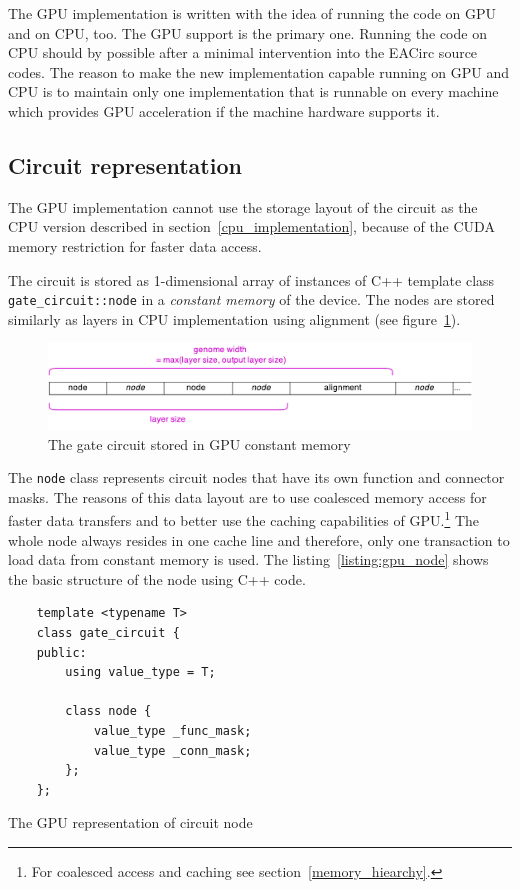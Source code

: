 \documentclass[12pt,twoside]{fithesis2}
\begin{document}
The GPU implementation is written with the idea of running the code on GPU and on CPU, too. The GPU support is the primary one. Running the code on CPU should by possible after a minimal intervention into the EACirc source codes. The reason to make the new implementation capable running on GPU and CPU is to maintain only one implementation that is runnable on every machine which provides GPU acceleration if the machine hardware supports it.

\subsection{Circuit representation}
\label{gpu_curcuit_repr}

The GPU implementation cannot use the storage layout of the circuit as the CPU version described in section~\ref{cpu_implementation}, because of the CUDA memory restriction for faster data access.

The circuit is stored as 1-dimensional array of instances of C++ template class \texttt{gate\_circuit::node} in a \emph{constant memory} of the device. The nodes are stored similarly as layers in CPU implementation using alignment (see figure~\ref{fig:gpu_genome}).

\begin{figure}[h]
	\centering
	\includegraphics[width=\textwidth]{figures/gpu_genome.pdf}
	\caption{The gate circuit stored in GPU constant memory}
	\label{fig:gpu_genome}
\end{figure}


The \texttt{node} class represents circuit nodes that have its own function and connector masks. The reasons of this data layout are to use coalesced memory access for faster data transfers and to better use the caching capabilities of GPU.\footnote{For coalesced access and caching see section~\ref{memory_hiearchy}.} The whole node always resides in one cache line and therefore, only one transaction to load data from constant memory is used. The listing~\ref{listing:gpu_node} shows the basic structure of the node using C++ code.

\begin{listing}[h]
	\begin{verbatim}
	template <typename T>
	class gate_circuit {
	public:
		using value_type = T;
		
		class node {
			value_type _func_mask;
			value_type _conn_mask;
		};	
	};
	\end{verbatim}
	\caption{The GPU representation of circuit node}
	\label{listing:gpu_node}
\end{listing}
\end{document}
